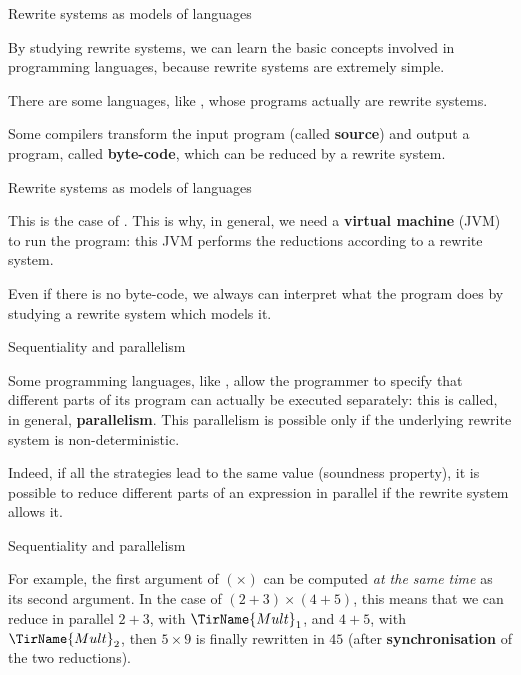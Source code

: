 %
\begin{frame}{Rewrite systems as models of languages}

  By studying rewrite systems, we can learn the basic concepts
  involved in programming languages, because rewrite systems are
  extremely simple.

  \bigskip

  There are some languages, like \Maude, whose programs actually are
  rewrite systems.

  \bigskip

  Some compilers transform the input program (called \textbf{source})
  and output a program, called \textbf{byte-code}, which can be
  reduced by a rewrite system.

\end{frame}

%
\begin{frame}{Rewrite systems as models of languages}

  This is the case of \Java. This is why, in general, we need a
  \textbf{\Java virtual machine} (JVM) to run the program: this JVM
  performs the reductions according to a rewrite system.

  \bigskip

  Even if there is no byte-code, we always can interpret what the
  program does by studying a rewrite system which models it.

\end{frame}

%
\begin{frame}{Sequentiality and parallelism}

  Some programming languages, like \Ada, allow the programmer to
  specify that different parts of its program can actually be executed
  separately: this is called, in general, \textbf{parallelism}. This
  parallelism is possible only if the underlying rewrite system is
  non-deterministic.

  \bigskip

  Indeed, if all the strategies lead to the same value (soundness
  property), it is possible to reduce different parts of an expression
  in parallel if the rewrite system allows it.

\end{frame}

%
\begin{frame}{Sequentiality and parallelism}

  For example, the first argument of \((\times)\) can be computed
  \emph{at the same time} as its second argument. In the case of
  \((2+3) \times (4+5)\), this means that we can reduce in parallel
  \(2+3\), with \(\TirName{Mult}_1\), and \(4+5\), with
  \(\TirName{Mult}_2\), then \(5 \times 9\) is finally rewritten in
  \(45\) (after \textbf{synchronisation} of the two reductions).

\end{frame}

